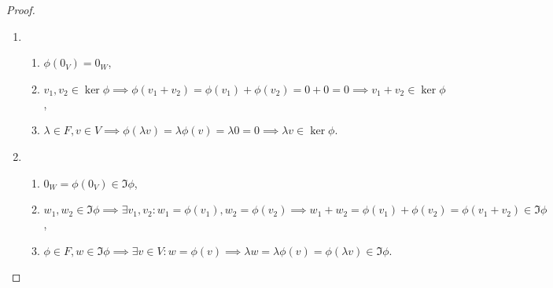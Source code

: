 \begin{proof}~
    \begin{enumerate}
    \item 
        \begin{enumerate}
        \item $\phi(0_V) = 0_W$,
        \item $v_1, v_2 \in \ker \phi \implies \phi(v_1 + v_2) = \phi(v_1) + \phi(v_2) = 0 + 0 = 0 \implies v_1 + v_2 \in \ker \phi$,
        \item $\lambda \in F, v \in V \implies \phi(\lambda v) = \lambda \phi(v) = \lambda 0 = 0 \implies \lambda v \in \ker \phi$.
        \end{enumerate}

    \item
        \begin{enumerate}
        \item $0_W = \phi(0_V) \in \Im \phi$,
        \item $w_1, w_2 \in \Im \phi \implies \exists v_1, v_2 : w_1 = \phi(v_1), w_2 = \phi(v_2) \implies w_1 + w_2 = \phi(v_1) + \phi(v_2) = \phi(v_1 + v_2) \in \Im \phi$,
        \item $\phi \in F, w \in \Im \phi \implies \exists v \in V : w = \phi(v) \implies \lambda w = \lambda \phi(v) = \phi(\lambda v) \in \Im \phi$.
            \qedhere
        \end{enumerate}
    \end{enumerate}
\end{proof}
